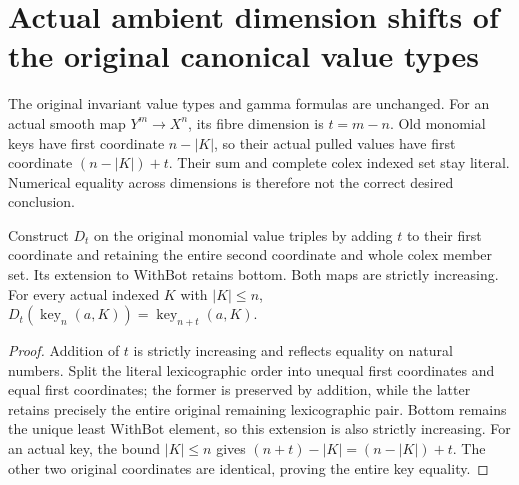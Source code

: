 \section{Actual ambient dimension shifts of the original canonical value types}

The original invariant value types and gamma formulas are unchanged.
For an actual smooth map $Y^m\to X^n$, its fibre dimension is $t=m-n$.
Old monomial keys have first coordinate $n-|K|$, so their actual pulled
values have first coordinate $(n-|K|)+t$. Their sum and complete colex
indexed set stay literal. Numerical equality across dimensions is therefore
not the correct desired conclusion.

\begin{lemma}
\label{hir:smooth-actual-value-ambient-key-shift}
\leanok
{}
Construct $D_t$ on the original monomial value triples by adding $t$ to
their first coordinate and retaining the entire second coordinate and
whole colex member set. Its extension to WithBot retains bottom. Both
maps are strictly increasing. For every actual indexed $K$ with $|K|\le n$,
$D_t(\operatorname{key}_n(a,K))=\operatorname{key}_{n+t}(a,K)$.
\end{lemma}
\begin{proof}
Addition of $t$ is strictly increasing and reflects equality on natural
numbers. Split the literal lexicographic order into unequal first
coordinates and equal first coordinates; the former is preserved by
addition, while the latter retains precisely the entire original remaining
lexicographic pair. Bottom remains the unique least WithBot element,
so this extension is also strictly increasing. For an actual key, the
bound $|K|\le n$ gives $(n+t)-|K|=(n-|K|)+t$. The other two original
coordinates are identical, proving the entire key equality.
\end{proof}

